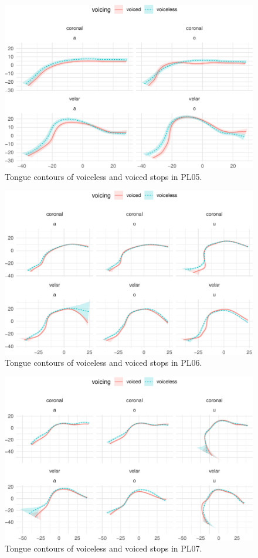 \documentclass[
  11pt,
]{article}
\begin{document}
\begin{figure}

{\centering \includegraphics[width=.8\textwidth]{2018-polar-gam_files/figure-latex/Figure16} 

}

\caption{Tongue contours of voiceless and voiced stops in PL05.}\label{f:Figure16}
\end{figure}

\begin{figure}

{\centering \includegraphics[width=.8\textwidth]{2018-polar-gam_files/figure-latex/Figure17} 

}

\caption{Tongue contours of voiceless and voiced stops in PL06.}\label{f:Figure17}
\end{figure}

\begin{figure}

{\centering \includegraphics[width=.8\textwidth]{2018-polar-gam_files/figure-latex/Figure18} 

}

\caption{Tongue contours of voiceless and voiced stops in PL07.}\label{f:Figure18}
\end{figure}
\end{document}
